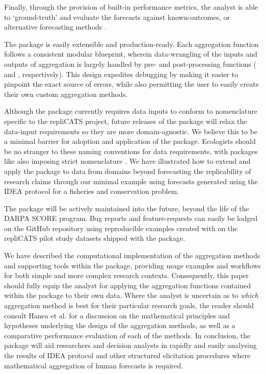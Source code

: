 \documentclass[article]{jss}
\newcommand{\fct}[1]{\code{#1()}}
\begin{document}
Finally, through the provision of built-in performance metrics, the
analyst is able to `ground-truth' and evaluate the forecasts against
known-outcomes, or alternative forecasting methods
\citep[e.g.][]{Arlidge2020}.

The  package is easily extensible and production-ready.
Each aggregation function follows a consistent modular blueprint,
wherein data-wrangling of the inputs and outputs of aggregation is
largely handled by pre- and post-processing functions
(\fct{preprocess_judgements} and \fct{postprocess_judgements},
respectively). This design expedites debugging by making it easier to
pinpoint the exact source of errors, while also permitting the user to
easily create their own custom aggregation methods.

Although the package currently requires data inputs to conform to
nomenclature specific to the repliCATS project, future releases of the
 package will relax the data-input requirements so they
are more domain-agnostic. We believe this to be a minimal barrier for
adoption and application of the  package. Ecologists
should be no stranger to these naming conventions for data requirements,
with packages like  also imposing strict nomenclature
\citep{veganpkg2020}. We have illustrated how to extend and apply the
package to data from domains beyond forecasting the replicability of
research claims through our minimal example using forecasts generated
using the IDEA protocol for a fisheries and conservation problem.

The package will be actively maintained into the future, beyond the life
of the DARPA SCORE program. Bug reports and feature-requests can easily
be lodged on the  GitHub repository using reproducible
examples created with  \citep{reprexpkg2020} on the
repliCATS pilot study datasets shipped with the  package.

We have described the computational implementation of the aggregation
methods and supporting tools within the  package,
providing usage examples and workflows for both simple and more complex
research contexts. Consequently, this paper should fully equip the
analyst for applying the aggregation functions contained within the
 package to their own data. Where the analyst is uncertain
as to \emph{which} aggregation method is best for their particular
research goals, the reader should consult Hanea et al.
\citeyearpar{Hanea2021} for a discussion on the mathematical principles
and hypotheses underlying the design of the aggregation methods, as well
as a comparative performance evaluation of each of the methods. In
conclusion, the  package will aid researchers and decision
analysts in rapidly and easily analysing the results of IDEA protocol
and other structured elicitation procedures where mathematical
aggregation of human forecasts is required.
\end{document}
